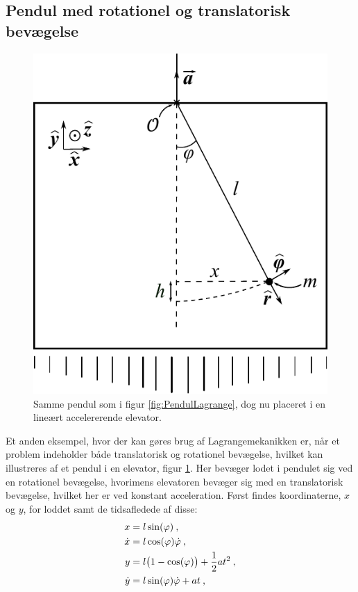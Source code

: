 \subsection{Pendul med rotationel og translatorisk bevægelse} \label{sec:elevator}
%
\begin{figure}[h!]
	\centering
	\includegraphics[scale=0.7]{Analytisk-Mekanik/PendulElevator.pdf}
	\caption{Samme pendul som i figur \ref{fig:PendulLagrange}, dog nu placeret i en lineært accelererende elevator.}
	\label{fig:PendulElevator}
\end{figure}
%
Et anden eksempel, hvor der kan gøres brug af Lagrangemekanikken er, når et problem indeholder både translatorisk og rotationel bevægelse, hvilket kan illustreres af et pendul i en elevator, figur \ref{fig:PendulElevator}. Her bevæger lodet i pendulet sig ved en rotationel bevægelse, hvorimens elevatoren bevæger sig med en translatorisk bevægelse, hvilket her er ved konstant acceleration. Først findes koordinaterne, $x$ og $y$, for loddet samt de tidsafledede af disse:
\begin{equation}
	\begin{aligned}
		x &= l \sin(\varphi) \: , \\
		\dot{x} &= l \cos(\varphi) \dot{\varphi} \: , \\
		y &= l \big(1-\cos(\varphi) \big) + \frac{1}{2} at^2 \: , \\
		\dot{y} &= l \sin(\varphi) \dot{\varphi} + at \: ,
	\end{aligned}
\end{equation}
